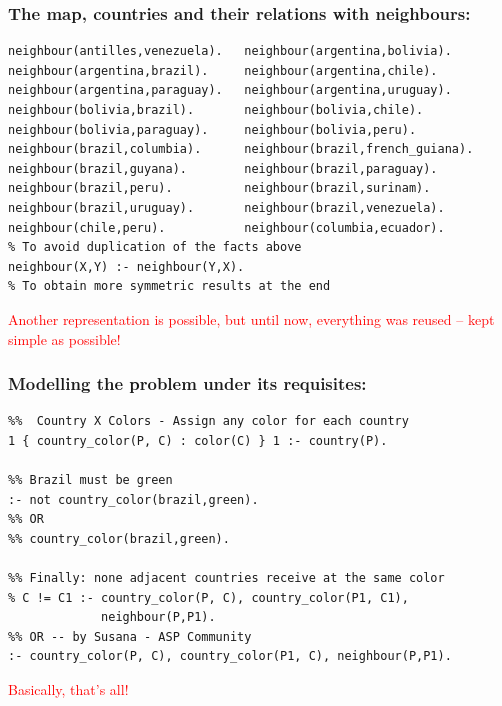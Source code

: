 \documentclass{beamer}
\begin{document}
\begin{frame}[fragile] 
	\frametitle{The map, countries and their relations with neighbours:}
	
{\small
\begin{verbatim}
neighbour(antilles,venezuela).   neighbour(argentina,bolivia).
neighbour(argentina,brazil).     neighbour(argentina,chile).
neighbour(argentina,paraguay).   neighbour(argentina,uruguay).
neighbour(bolivia,brazil).       neighbour(bolivia,chile).
neighbour(bolivia,paraguay).     neighbour(bolivia,peru).
neighbour(brazil,columbia).      neighbour(brazil,french_guiana).
neighbour(brazil,guyana).        neighbour(brazil,paraguay).
neighbour(brazil,peru).          neighbour(brazil,surinam).
neighbour(brazil,uruguay).       neighbour(brazil,venezuela).
neighbour(chile,peru).           neighbour(columbia,ecuador).
% To avoid duplication of the facts above
neighbour(X,Y) :- neighbour(Y,X). 
% To obtain more symmetric results at the end
\end{verbatim}
}	
\textcolor{red}{Another representation is possible, but until now, everything was reused -- kept simple as possible!}
\end{frame}


\begin{frame}[fragile] 
	\frametitle{Modelling the problem under its requisites:}
	
{\small
\begin{verbatim}
%%  Country X Colors - Assign any color for each country
1 { country_color(P, C) : color(C) } 1 :- country(P).

%% Brazil must be green
:- not country_color(brazil,green).
%% OR
%% country_color(brazil,green).

%% Finally: none adjacent countries receive at the same color
% C != C1 :- country_color(P, C), country_color(P1, C1), 
             neighbour(P,P1).
%% OR -- by Susana - ASP Community         
:- country_color(P, C), country_color(P1, C), neighbour(P,P1).
\end{verbatim}
}	
\textcolor{red}{Basically, that's all!}
\end{frame}


\end{document}

